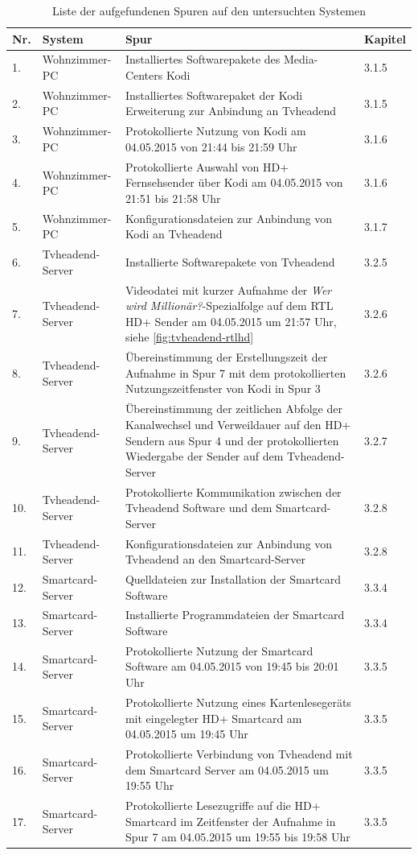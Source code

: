 \begin{table}
\begin{tabular}{p{0.3cm}p{3cm}p{9cm}p{1.1cm}}
\toprule
Nr. & System & Spur & Kapitel \\ 
\toprule
1. & Wohnzimmer-PC & Installiertes Softwarepakete des Media-Centers Kodi & 3.1.5 \\ 
\hline
2. & Wohnzimmer-PC & Installiertes Softwarepaket der Kodi Erweiterung zur Anbindung an Tvheadend & 3.1.5 \\ 
\hline
3. & Wohnzimmer-PC & Protokollierte Nutzung von Kodi am 04.05.2015 von 21:44 bis 21:59 Uhr & 3.1.6 \\ 
\hline
4. & Wohnzimmer-PC & Protokollierte Auswahl von HD+ Fernsehsender über Kodi am 04.05.2015 von 21:51 bis 21:58 Uhr & 3.1.6 \\ 
\hline
5. & Wohnzimmer-PC & Konfigurationsdateien zur Anbindung von Kodi an Tvheadend & 3.1.7 \\ 
\hline
6. & Tvheadend-Server & Installierte Softwarepakete von Tvheadend & 3.2.5 \\ 
\hline
7. & Tvheadend-Server & Videodatei mit kurzer Aufnahme der \textit{Wer wird Millionär?}-Spezialfolge auf dem RTL HD+ Sender am 04.05.2015 um 21:57 Uhr, siehe \autoref{fig:tvheadend-rtlhd} & 3.2.6 \\ 
\hline
8. & Tvheadend-Server & Übereinstimmung der Erstellungszeit der Aufnahme in Spur 7 mit dem protokollierten Nutzungszeitfenster von Kodi in Spur 3 & 3.2.6 \\ 
\hline
9. & Tvheadend-Server & Übereinstimmung der zeitlichen Abfolge der Kanalwechsel und Verweildauer auf den HD+ Sendern aus Spur 4 und der protokollierten Wiedergabe der Sender auf dem Tvheadend-Server & 3.2.7 \\ 
\hline
10. & Tvheadend-Server & Protokollierte Kommunikation zwischen der Tvheadend Software und dem Smartcard-Server & 3.2.8 \\ 
\hline
11. & Tvheadend-Server & Konfigurationsdateien zur Anbindung von Tvheadend an den Smartcard-Server & 3.2.8 \\ 
\hline
12. & Smartcard-Server & Quelldateien zur Installation der Smartcard Software & 3.3.4 \\ 
\hline
13. & Smartcard-Server & Installierte Programmdateien der Smartcard Software & 3.3.4 \\
\hline
14. & Smartcard-Server & Protokollierte Nutzung der Smartcard Software am 04.05.2015 von 19:45 bis 20:01 Uhr & 3.3.5 \\
\hline
15. & Smartcard-Server & Protokollierte Nutzung eines Kartenlesegeräts mit eingelegter HD+ Smartcard am 04.05.2015 um 19:45 Uhr & 3.3.5 \\
\hline
16. & Smartcard-Server & Protokollierte Verbindung von Tvheadend mit dem Smartcard Server am 04.05.2015 um 19:55 Uhr & 3.3.5 \\
\hline
17. & Smartcard-Server & Protokollierte Lesezugriffe auf die HD+ Smartcard im Zeitfenster der Aufnahme in Spur 7 am 04.05.2015 um 19:55 bis 19:58 Uhr & 3.3.5 \\
 \bottomrule
\end{tabular}
\caption{Liste der aufgefundenen Spuren auf den untersuchten Systemen}
\label{table:summary-traces}
\end{table}